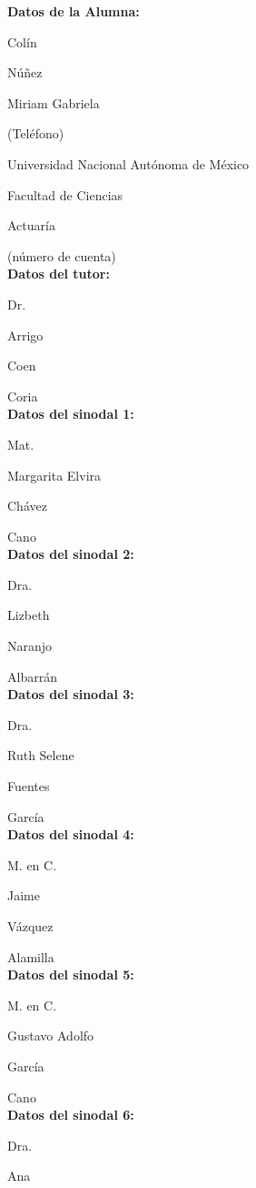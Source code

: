{\setlength{\parskip}{0mm}
\textbf{Datos de la Alumna:}

Colín

Núñez

Miriam Gabriela

(Teléfono)

Universidad Nacional Autónoma de México

Facultad de Ciencias

Actuaría

(número de cuenta)\\


\textbf{Datos del tutor:}

Dr.

Arrigo

Coen

Coria\\


\textbf{Datos del sinodal 1:}

Mat.

Margarita Elvira

Chávez

Cano\\


\textbf{Datos del sinodal 2:}

Dra.

Lizbeth

Naranjo

Albarrán\\


\textbf{Datos del sinodal 3:}

Dra.

Ruth Selene

Fuentes

García\\


\textbf{Datos del sinodal 4:}

M. en C.

Jaime

Vázquez

Alamilla\\


\textbf{Datos del sinodal 5:}

M. en C.

Gustavo Adolfo

García

Cano\\


\textbf{Datos del sinodal 6:}

Dra.

Ana

}
